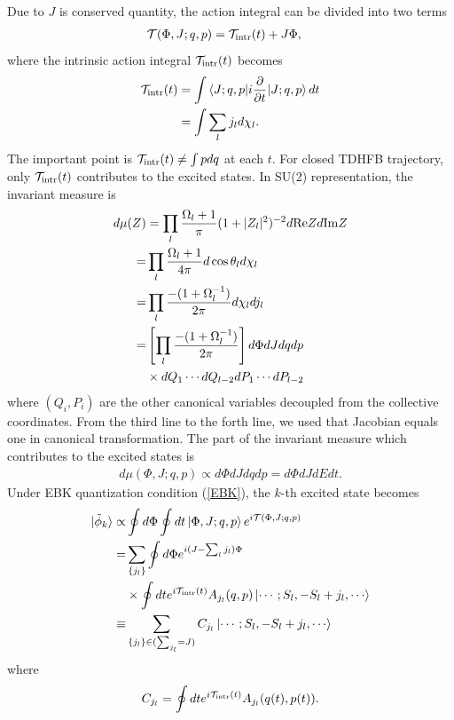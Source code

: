 \documentclass[%
superscriptaddress,
showpacs,
nofootinbib,
amsmath,amssymb,
aps,
prc,
twocolumn,
floatfix ]%
{revtex4-1}
\begin{document}
Due to $J$ is conserved quantity, the action integral can be divided into two terms
\begin{align}
  \mathcal{T}(\Phi,J;q,p) &= \mathcal{T}_{\rm intr}(t) + J\Phi, 
\end{align}
where the intrinsic action integral $\mathcal{T}_{\rm intr}(t)$ becomes
\begin{align}
  \mathcal{T}_{\rm intr}(t) &= \int \braket{J;q,p|i\frac{\partial}{\partial t}|J;q,p} dt
	 \nonumber \\
	&= \int \sum_l j_l d\chi_l .
	\label{tau}
\end{align}
The important point is $\mathcal{T}_{\rm intr}(t) \ne \int p dq$ at each $t$. For closed TDHFB trajectory, only $\mathcal{T}_{\rm intr}(t)$ contributes to the excited states.
In SU(2) representation, the invariant measure is
\begin{align}
  d\mu(Z) &= \prod_l \frac{\Omega_l+1}{\pi} (1+|Z_l|^2)^{-2} d{\rm Re}Z d{\rm Im}Z \nonumber \\
 =& \prod_l \frac{\Omega_l+1}{4\pi} d \cos{\theta_l} d\chi_l \nonumber \\
 =& \prod_l \frac{-(1+\Omega_l^{-1})}{2\pi} d\chi_l dj_l \nonumber \\
 =& \left[ \prod_l \frac{-(1+\Omega_l^{-1})}{2\pi} \right] d\Phi dJ dqdp \nonumber \\
 &\times dQ_1\cdots dQ_{l-2}dP_1\cdots dP_{l-2}
	\label{dmu}
\end{align}
where $(Q_i,P_i)$ are the other canonical variables decoupled from the collective coordinates. From the third line to the forth line, we used that Jacobian equals one in canonical transformation. The part of the invariant measure which contributes to the excited states is
\begin{align}
d\mu(\Phi,J;q,p) \propto d\Phi dJ dqdp = d\Phi dJ dE dt. 
\end{align}
Under EBK quantization condition (\ref{EBK}),
the $k$-th excited state becomes
\begin{align}
 \ket{\tilde{\phi}_k} \propto& \oint d\Phi \oint dt \ket{\Phi,J;q,p} e^{i\mathcal{T}(\Phi,J;q,p)}
 \nonumber \\
 =& \sum_{\{j_l\}} \oint d\Phi e^{i(J-\sum_l j_l)\Phi} \nonumber \\
 &\times \oint dt e^{i\mathcal{T}_{\rm intr}(t)} A_{j_l}(q,p) \ket{\cdots;S_l,-S_l+j_l,\cdots} \nonumber \\
 \equiv& \sum_{\{j_l\}\in (\sum_{j_l}=J)} C_{j_l} \ket{\cdots;S_l,-S_l+j_l,\cdots}
 \label{SPA2}
\end{align}
where
\begin{align}
  C_{j_l} = \oint dt e^{i\mathcal{T}_{\rm intr}(t)} A_{j_l}(q(t),p(t)).
  \label{coef}
\end{align}
\end{document}
